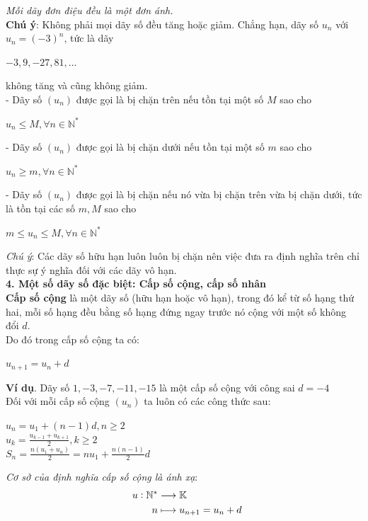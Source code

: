 \documentclass[12pt,oneside,a4paper,reqno]{book}
\begin{document}
\textit{Mỗi dãy đơn điệu đều là một đơn ánh.}\\
\textbf{Chú ý}: Không phải mọi dãy số đều tăng hoặc giảm. Chẳng hạn, dãy số $u_n$ với $u_n=(-3)^n$, tức là dãy\\
\begin{center}
$-3, 9, -27, 81, ...$
\end{center}
không tăng và cũng không giảm.\\
- Dãy số $(u_n)$ được gọi là bị chặn trên nếu tồn tại một số $M$ sao cho \\
\begin{center}
$u_n \le M, \forall n \in \mathbb{N}^*$
\end{center}
- Dãy số $(u_n)$ được gọi là bị chặn dưới nếu tồn tại một số $m$ sao cho \\
\begin{center}
$u_n \ge m, \forall n \in \mathbb{N}^*$
\end{center}
- Dãy số $(u_n)$ được gọi là bị chặn nếu nó vừa bị chặn trên vừa bị chặn dưới, tức là tồn tại các số $m, M$ sao cho\\
\begin{center}
$m \le u_n \le M, \forall n \in \mathbb{N}^*$
\end{center}
\textit{Chú ý}: Các dãy số hữu hạn luôn luôn bị chặn nên việc đưa ra định nghĩa trên chỉ thực sự ý nghĩa đối với các dãy vô hạn.\\
\textbf{4. Một số dãy số đặc biệt: Cấp số cộng, cấp số nhân}\\
\textbf{Cấp số cộng} là một dãy số (hữu hạn hoặc vô hạn), trong đó kể từ số hạng thứ hai, mỗi số hạng đều bằng số hạng đứng ngay trước nó cộng với một số không đổi $d$.\\
Do đó trong cấp số cộng ta có:\\
\begin{center}
$u_{n+1}=u_n+d$
\end{center}
{\bf Ví dụ}. Dãy số $1, -3, -7, -11, -15$ là một cấp số cộng với công sai $d=-4$\\
Đối với mỗi cấp số cộng $(u_n)$ ta luôn có các công thức sau:
\begin{center}
$u_n=u_1+(n-1)d , n \ge 2$\\
$u_k=\frac{u_{k-1}+u_{k+1}}{2} , k \ge 2$\\
$S_n=\frac{n(u_1+u_n)}{2}=nu_1+\frac{n(n-1)}2{d}$
\end{center}
\textit{Cơ sở của định nghĩa cấp số cộng là ánh xạ}:\\
\begin{align*}
\text{ \space}u:\mathbb{N^*}&\longrightarrow\mathbb{K}\\
n&\longmapsto u_{n+1}=u_n+d 
\end{align*}
\end{document}
